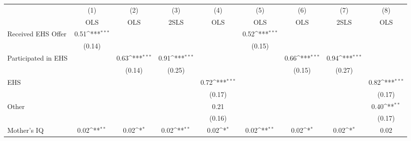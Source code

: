 {
\def\sym#1{\ifmmode^{#1}\else\(^{#1}\)\fi}
\begin{tabular}{l*{8}{c}}
\hline\hline
                    &\multicolumn{1}{c}{(1)}&\multicolumn{1}{c}{(2)}&\multicolumn{1}{c}{(3)}&\multicolumn{1}{c}{(4)}&\multicolumn{1}{c}{(5)}&\multicolumn{1}{c}{(6)}&\multicolumn{1}{c}{(7)}&\multicolumn{1}{c}{(8)}\\
                    &\multicolumn{1}{c}{OLS}&\multicolumn{1}{c}{OLS}&\multicolumn{1}{c}{2SLS}&\multicolumn{1}{c}{OLS}&\multicolumn{1}{c}{OLS}&\multicolumn{1}{c}{OLS}&\multicolumn{1}{c}{2SLS}&\multicolumn{1}{c}{OLS}\\
\hline
Received EHS Offer  &        0.51\sym{***}&                     &                     &                     &        0.52\sym{***}&                     &                     &                     \\
                    &      (0.14)         &                     &                     &                     &      (0.15)         &                     &                     &                     \\
[1em]
Participated in EHS &                     &        0.63\sym{***}&        0.91\sym{***}&                     &                     &        0.66\sym{***}&        0.94\sym{***}&                     \\
                    &                     &      (0.14)         &      (0.25)         &                     &                     &      (0.15)         &      (0.27)         &                     \\
[1em]
EHS                 &                     &                     &                     &        0.72\sym{***}&                     &                     &                     &        0.82\sym{***}\\
                    &                     &                     &                     &      (0.17)         &                     &                     &                     &      (0.17)         \\
[1em]
Other               &                     &                     &                     &        0.21         &                     &                     &                     &        0.40\sym{**} \\
                    &                     &                     &                     &      (0.16)         &                     &                     &                     &      (0.17)         \\
[1em]
Mother's IQ         &        0.02\sym{**} &        0.02\sym{*}  &        0.02\sym{**} &        0.02\sym{*}  &        0.02\sym{**} &        0.02\sym{*}  &        0.02\sym{*}  &        0.02         \\

\end{tabular}}
